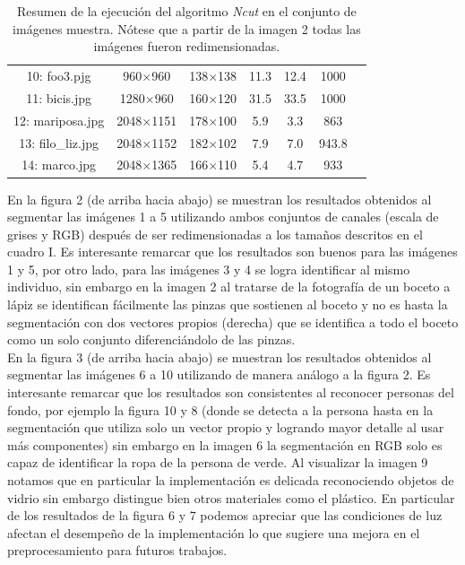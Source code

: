 \documentclass[conference]{IEEEtran}
\begin{document}
\begin{table}[h]
\begin{center}
\begin{tabular}{c|cccccc}
10: foo3.pjg&960$\times$960&138$\times$138&11.3&12.4&1000\\
11: bicis.jpg&1280$\times$960& 160$\times$120&31.5&33.5&1000\\
12: mariposa.jpg&2048$\times$1151&178$\times$100&5.9&3.3&863\\
13: filo\_liz.jpg&2048$\times$1152& 182$\times$102&7.9&7.0&943.8\\
14: marco.jpg&2048$\times$1365& 166$\times$110&5.4&4.7&933\\
\hline
\end{tabular}
\caption{Resumen de la ejecución del algoritmo \textit{Ncut} en el conjunto de imágenes muestra. Nótese que a partir de la imagen 2 todas las imágenes fueron redimensionadas.}
\label{tresultados}
\end{center}
\end{table}
\FloatBarrier
En la figura 2 (de arriba hacia abajo) se muestran los resultados obtenidos al segmentar las imágenes 1 a 5 utilizando ambos conjuntos de canales (escala de grises y RGB) después de ser redimensionadas a los tamaños descritos en el cuadro I. Es interesante remarcar que los resultados son buenos para las imágenes 1 y 5, por otro lado, para las imágenes 3 y 4 se logra identificar al mismo individuo, sin embargo en la imagen 2 al tratarse de la fotografía de un boceto a lápiz se identifican fácilmente las pinzas que sostienen al boceto y no es hasta la segmentación con dos vectores propios (derecha) que se identifica a todo el boceto como un solo conjunto diferenciándolo de las pinzas. \\
En la figura 3 (de arriba hacia abajo) se muestran los resultados obtenidos al segmentar las imágenes 6 a 10 utilizando de manera análogo a la figura 2. Es interesante remarcar que los resultados son consistentes al reconocer personas del fondo, por ejemplo la figura 10 y 8 (donde se detecta a la persona hasta en la segmentación que utiliza solo un vector propio y logrando mayor detalle al usar más componentes) sin embargo en la imagen 6 la segmentación en RGB solo es capaz de identificar la ropa de la persona de verde. Al visualizar la imagen 9 notamos que en particular la implementación es delicada reconociendo objetos de vidrio sin embargo distingue bien otros materiales como el plástico. En particular de los resultados de la figura 6 y 7 podemos apreciar que las condiciones de luz afectan el desempeño de la implementación lo que sugiere una mejora en el preprocesamiento para futuros trabajos.\\
\end{document}

